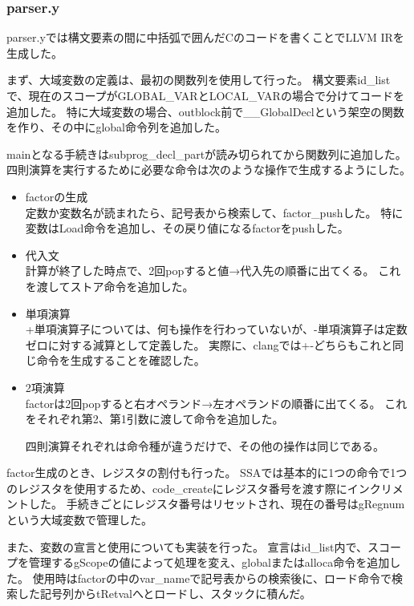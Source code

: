\subsubsection{parser.y}
parser.yでは構文要素の間に中括弧で囲んだCのコードを書くことでLLVM IRを生成した。

まず、大域変数の定義は、最初の関数列を使用して行った。
構文要素id\_listで、現在のスコープがGLOBAL\_VARとLOCAL\_VARの場合で分けてコードを追加した。
特に大域変数の場合、outblock前で\_\_GlobalDeclという架空の関数を作り、その中にglobal命令列を追加した。

mainとなる手続きはsubprog\_decl\_partが読み切られてから関数列に追加した。\\

四則演算を実行するために必要な命令は次のような操作で生成するようにした。
\begin{itemize}
  \item factorの生成\\
        定数か変数名が読まれたら、記号表から検索して、factor\_pushした。
        特に変数はLoad命令を追加し、その戻り値になるfactorをpushした。
  \item 代入文\\
        計算が終了した時点で、2回popすると値→代入先の順番に出てくる。
        これを渡してストア命令を追加した。
  \item 単項演算\\
        +単項演算子については、何も操作を行わっていないが、-単項演算子は定数ゼロに対する減算として定義した。
        実際に、clangでは+-どちらもこれと同じ命令を生成することを確認した。
  \item 2項演算\\
        factorは2回popすると右オペランド→左オペランドの順番に出てくる。
        これをそれぞれ第2、第1引数に渡して命令を追加した。

        四則演算それぞれは命令種が違うだけで、その他の操作は同じである。
\end{itemize}

factor生成のとき、レジスタの割付も行った。
SSAでは基本的に1つの命令で1つのレジスタを使用するため、code\_createにレジスタ番号を渡す際にインクリメントした。
手続きごとにレジスタ番号はリセットされ、現在の番号はgRegnumという大域変数で管理した。

また、変数の宣言と使用についても実装を行った。
宣言はid\_list内で、スコープを管理するgScopeの値によって処理を変え、globalまたはalloca命令を追加した。
使用時はfactorの中のvar\_nameで記号表からの検索後に、ロード命令で検索した記号列からtRetvalへとロードし、スタックに積んだ。

